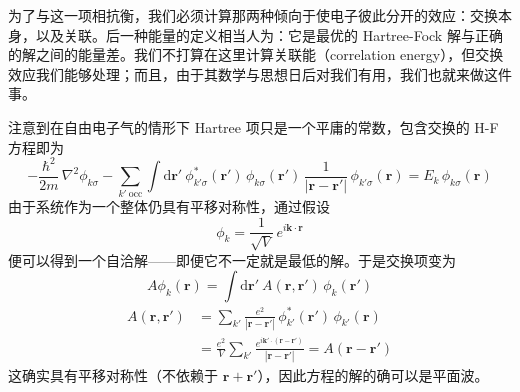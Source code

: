 为了与这一项相抗衡，我们必须计算那两种倾向于使电子彼此分开的效应：交换本身，以及关联。后一种能量的定义相当人为：它是最优的 Hartree-Fock 解与正确的解之间的能量差。我们不打算在这里计算关联能（correlation energy），但交换效应我们能够处理；而且，由于其数学与思想日后对我们有用，我们也就来做这件事。

注意到在自由电子气的情形下 Hartree 项只是一个平庸的常数，包含交换的 H-F 方程即为
\begin{equation*}
-\frac{\hbar^2}{2m}\,\nabla^2\phi_{k\sigma} - \sum_{k'\ \mathrm{occ}} \int \mathrm{d}\mathbf{r}'\ \phi^*_{k'\sigma}(\mathbf{r}')\,\phi_{k\sigma}(\mathbf{r}')\,\frac{1}{|\mathbf{r}-\mathbf{r}'|}\,\phi_{k'\sigma}(\mathbf{r}) = E_k\,\phi_{k\sigma}(\mathbf{r})
\end{equation*}
由于系统作为一个整体仍具有平移对称性，通过假设
\begin{equation*}
\phi_k = \frac{1}{\sqrt{V}}\,e^{i\mathbf{k}\cdot\mathbf{r}}
\end{equation*}
便可以得到一个自洽解——即便它不一定就是最低的解。于是交换项变为
\begin{equation*}
A\phi_k(\mathbf{r}) = \int \mathrm{d}\mathbf{r}'\ A(\mathbf{r},\mathbf{r}')\,\phi_k(\mathbf{r}')
\end{equation*}
\begin{align*}
A(\mathbf{r},\mathbf{r}') &= \sum_{k'}\frac{e^2}{|\mathbf{r}-\mathbf{r}'|}\,\phi^*_{k'}(\mathbf{r}')\,\phi_{k'}(\mathbf{r})\\
&= \frac{e^2}{V}\sum_{k'}\frac{e^{i\mathbf{k}'\cdot(\mathbf{r}-\mathbf{r}')}}{|\mathbf{r}-\mathbf{r}'|} = A(\mathbf{r}-\mathbf{r}')
\end{align*}
这确实具有平移对称性（不依赖于 $\mathbf{r}+\mathbf{r}'$），因此方程的解的确可以是平面波。

